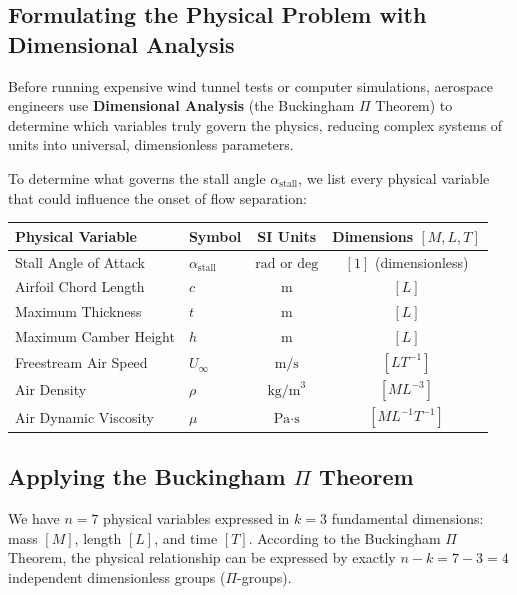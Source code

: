 \documentclass[11pt,a4paper]{article}
\begin{document}
\subsection{Formulating the Physical Problem with Dimensional Analysis}
Before running expensive wind tunnel tests or computer simulations, aerospace engineers use \textbf{Dimensional Analysis} (the Buckingham $\Pi$ Theorem) to determine which variables truly govern the physics, reducing complex systems of units into universal, dimensionless parameters.

To determine what governs the stall angle $\alpha_{\text{stall}}$, we list every physical variable that could influence the onset of flow separation:
\begin{center}
\small
\renewcommand{\arraystretch}{1.2}
\begin{tabular}{@{}llcc@{}}
\toprule
\textbf{Physical Variable} & \textbf{Symbol} & \textbf{SI Units} & \textbf{Dimensions} $[M, L, T]$ \\ \midrule
Stall Angle of Attack & $\alpha_{\text{stall}}$ & $\text{rad}$ or $\text{deg}$ & $[1]$ (dimensionless) \\
Airfoil Chord Length & $c$ & $\text{m}$ & $[L]$ \\
Maximum Thickness & $t$ & $\text{m}$ & $[L]$ \\
Maximum Camber Height & $h$ & $\text{m}$ & $[L]$ \\
Freestream Air Speed & $U_\infty$ & $\text{m/s}$ & $[L T^{-1}]$ \\
Air Density & $\rho$ & $\text{kg/m}^3$ & $[M L^{-3}]$ \\
Air Dynamic Viscosity & $\mu$ & $\text{Pa}\cdot\text{s}$ & $[M L^{-1} T^{-1}]$ \\ \bottomrule
\end{tabular}
\end{center}

\subsection{Applying the Buckingham \texorpdfstring{$\Pi$}{Pi} Theorem}
We have $n = 7$ physical variables expressed in $k = 3$ fundamental dimensions: mass $[M]$, length $[L]$, and time $[T]$. According to the Buckingham $\Pi$ Theorem, the physical relationship can be expressed by exactly $n - k = 7 - 3 = 4$ independent dimensionless groups ($\Pi$-groups).
\end{document}
